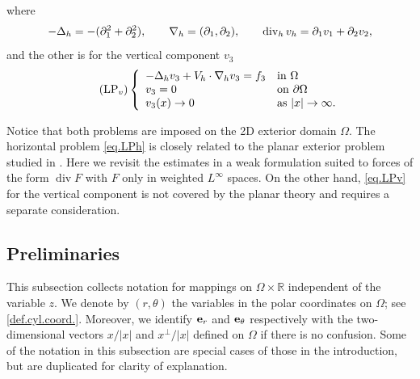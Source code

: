 \documentclass[11pt,a4paper]{article}
\numberwithin{equation}{section}
\newcommand{\R}{\mathbb{R}}
\newcommand{\opdiv}{\operatorname{div}}
\newcommand{\h}{{\rm h}}
\newcommand{\vv}{{\rm v}}
\begin{document}
%
where 
%
\begin{align}\label{def.op.h.2}
-\Delta_\h=-(\partial_1^2+\partial_2^2), 
\qquad
\nabla_\h=(\partial_1,\partial_2), 
\qquad
\opdiv_\h v_\h = \partial_1 v_1 + \partial_2 v_2, 
\end{align}
%
and the other is for the vertical component $v_3$
%
\begin{equation}\tag{LP$_\vv$}\label{eq.LPv}
\left\{
\begin{array}{ll}
- \Delta_\h v_3 
+ V_\h\cdot\nabla_\h v_3
= f_3&\mbox{in}\ \Omega \\ 
v_3 = 0 &\mbox{on}\ \partial\Omega \\ 
v_3(x)\to0&\mbox{as}\ |x|\to\infty. 
\end{array}\right. 
\end{equation}
%


Notice that both problems are imposed on the 2D exterior domain $\Omega$. The horizontal problem \eqref{eq.LPh} is closely related to the planar exterior problem studied in \cite{Higaki2023}. Here we revisit the estimates in a weak formulation suited to forces of the form $\opdiv F$ with $F$ only in weighted $L^\infty$ spaces. On the other hand, \eqref{eq.LPv} for the vertical component is not covered by the planar theory and requires a separate consideration. 


\subsection{Preliminaries}
\label{subsec.prelim}


This subsection collects notation for mappings on $\Omega\times\R$ independent of the variable $z$. We denote by $(r,\theta)$ the variables in the polar coordinates on $\Omega$; see \eqref{def.cyl.coord.}. Moreover, we identify ${\bf e}_r$ and ${\bf e}_\theta$ respectively with the two-dimensional vectors $x/|x|$ and $x^\bot/|x|$ defined on $\Omega$ if there is no confusion. Some of the notation in this subsection are special cases of those in the introduction, but are duplicated for clarity of explanation. 
\end{document}

